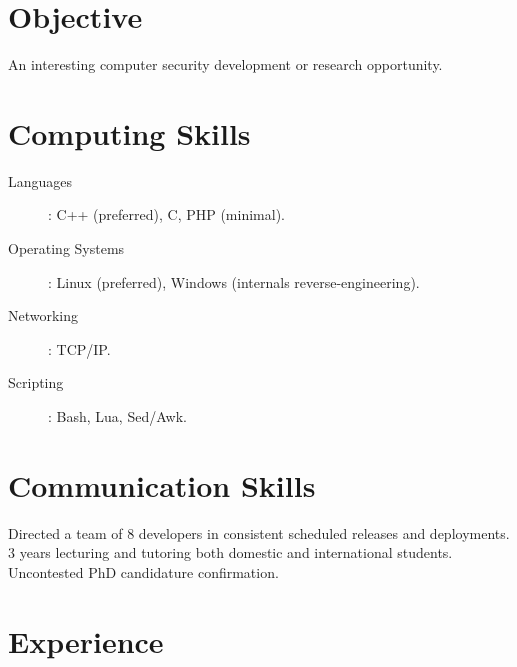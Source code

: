  
\begin{resume}  

\section{Objective}
An interesting computer security development or research opportunity.

\section{Computing Skills}
\noindent
\begin{description}
\item[Languages]: C++ (preferred), C, PHP (minimal).
\item[Operating Systems]: Linux (preferred), Windows (internals reverse-engineering).
\item[Networking]: TCP/IP.
\item[Scripting]: Bash, Lua, Sed/Awk.
\end{description}



\section{Communication Skills}
Directed a team of 8 developers in consistent scheduled releases and deployments. \\
3 years lecturing and tutoring both domestic and international students. \\
Uncontested PhD candidature confirmation.


\section{Experience}


\end{resume}
